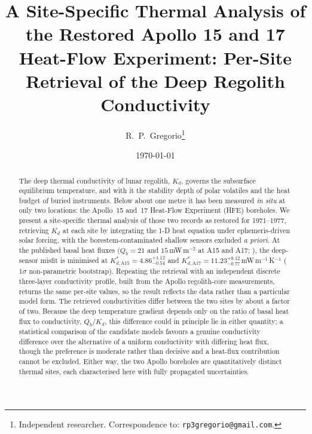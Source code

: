 \documentclass[11pt]{article}
\title{\bfseries A Site-Specific Thermal Analysis of the Restored
Apollo 15 and 17 Heat-Flow Experiment: Per-Site Retrieval of the
Deep Regolith Conductivity}
\author{R.~P.~Gregorio\thanks{Independent researcher.
Correspondence to: \texttt{rp3gregorio@gmail.com}.}}
\date{\today}
\begin{document}
\linenumbers
\maketitle

\begin{abstract}
\noindent
The deep thermal conductivity of lunar regolith, $K_d$, governs the
subsurface equilibrium temperature, and with it the stability depth
of polar volatiles and the heat budget of buried instruments. Below
about one metre it has been measured \emph{in situ} at only two
locations: the Apollo~15 and~17 Heat-Flow Experiment (HFE) boreholes.
We present a site-specific thermal analysis of those two records as
restored for 1971--1977, retrieving $K_d$ at each site by integrating
the 1-D heat equation under ephemeris-driven solar forcing, with the
borestem-contaminated shallow sensors excluded \emph{a priori}. At the
published basal heat fluxes ($Q_b=21$ and $15$\,mW\,m$^{-2}$ at A15
and A17; \citealp{langseth1976,nagihara2018}), the deep-sensor misfit
is minimised at $K_{d,\mathrm{A15}}^{*}=4.86^{+1.12}_{-0.54}$ and
$K_{d,\mathrm{A17}}^{*}=11.23^{+8.12}_{-0.77}$\,mW\,m$^{-1}$\,K$^{-1}$
($1\sigma$ non-parametric bootstrap). Repeating the retrieval with an
independent discrete three-layer conductivity profile, built from the
Apollo regolith-core measurements, returns the same per-site values,
so the result reflects the data rather than a particular model form.
The retrieved conductivities differ between the two sites by about a
factor of two. Because the deep temperature gradient depends only on
the ratio of basal heat flux to conductivity, $Q_b/K_d$, this
difference could in principle lie in either quantity; a statistical
comparison of the candidate models favours a genuine conductivity
difference over the alternative of a uniform conductivity with
differing heat flux, though the preference is moderate rather than
decisive and a heat-flux contribution cannot be excluded. Either way,
the two Apollo boreholes are quantitatively distinct thermal sites,
each characterised here with fully propagated uncertainties.
\end{abstract}
\end{document}
